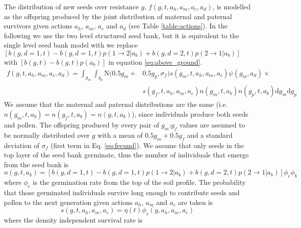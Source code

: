 \documentclass[12pt, a4paper]{article}
\begin{document}
The distribution of new seeds over resistance $g$, $f(g, t, a_h, a_m, a_c, a_d)$, is modelled as the offspring produced by the joint distribution of maternal and paternal survivors given actions $a_h$, $a_m$, $a_c$ and $a_d$ (see Table \ref{table:actions}). In the following we use the two level structured seed bank, but it is equivalent to the single level seed bank model with we replace $[b(g, d = 1, t) - b(g, d = 1, t)p(1 \rightarrow 2|a_b) + b(g, d = 2, t)p(2 \rightarrow 1|a_b)]$ with $[b(g, t) - b(g, t)p(a_b)]$ in equation \ref{eq:above_ground}.        
\begin{equation}
\label{eq:fecund}
\begin{split}
	f(g, t, a_h, a_m, a_c, a_d) = \displaystyle\int_{g_m}\int_{g_p} \text{N}(0.5 g_m + &0.5 g_p, \sigma_f)s(g_m, t, a_h, a_m, a_c)\psi(g_m,a_d)\times \\ 
		&s(g_f, t, a_h, a_m, a_c)n(g_m, t, a_b)n(g_p, t, a_b)\text{d}g_m\text{d}g_p 
\end{split}
\end{equation}
We assume that the maternal and paternal distributions are the same (i.e. $n(g_m, t, a_b) = n(g_f, t, a_b) = n(g, t, a_b)$), since individuals produce both seeds and pollen. The offspring produced by every pair of $g_m$:$g_f$ values are assumed to be normally distributed over $g$ with a mean of $0.5g_m + 0.5g_f$ and a standard deviation of $\sigma_f$ (first term in Eq. \ref{eq:fecund}). We assume that only seeds in the top layer of the seed bank germinate, thus the number of individuals that emerge from the seed bank is
\begin{equation}\label{eq:above_ground}
	n(g, t, a_b) = [b(g, d = 1, t) - b(g, d = 1, t)p(1 \rightarrow 2|a_b) + b(g, d = 2, t)p(2 \rightarrow 1|a_b)]\phi_e\phi_b
\end{equation}
where $\phi_e$ is the germination rate from the top of the soil profile. The probability that those germinated individuals survive long enough to contribute seeds and pollen to the next generation given actions $a_h$, $a_m$ and $a_c$ are taken is 
\begin{equation}
\label{eq:survival}
	s(g, t, a_h, a_m, a_c) = \eta(t)\phi_s(g, a_h, a_m, a_c) 
\end{equation}   
where the density independent survival rate is 
\end{document}

